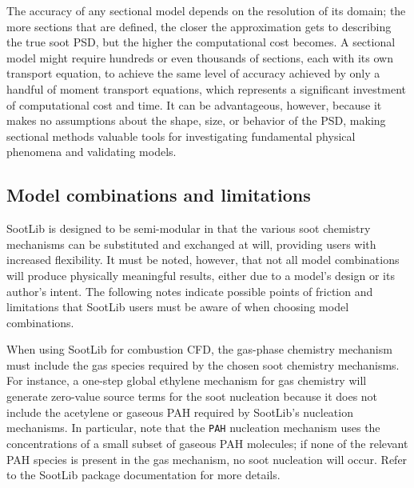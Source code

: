 \documentclass[preprint,letterpaper]{elsarticle}
\begin{document}
The accuracy of any sectional model depends on the resolution of its domain; the more sections that are defined, the closer the approximation gets to describing the true soot PSD, but the higher the computational cost becomes. A sectional model might require hundreds or even thousands of sections, each with its own transport equation, to achieve the same level of accuracy achieved by only a handful of moment transport equations, which represents a significant investment of computational cost and time. It can be advantageous, however, because it makes no assumptions about the shape, size, or behavior of the PSD, making sectional methods valuable tools for investigating fundamental physical phenomena and validating models.

\subsection{Model combinations and limitations}
\label{s:limitations}

SootLib is designed to be semi-modular in that the various soot chemistry mechanisms can be substituted and exchanged at will, providing users with increased flexibility. It must be noted, however, that not all model combinations will produce physically meaningful results, either due to a model's design or its author's intent. The following notes indicate possible points of friction and limitations that SootLib users must be aware of when choosing model combinations.

When using SootLib for combustion CFD, the gas-phase chemistry mechanism must include the gas species required by the chosen soot chemistry mechanisms. For instance, a one-step global ethylene mechanism for gas chemistry will generate zero-value source terms for the soot nucleation because it does not include the acetylene or gaseous PAH required by SootLib's nucleation mechanisms.
In particular, note that the \texttt{PAH} nucleation mechanism uses the concentrations of a small subset of gaseous PAH molecules; if none of the relevant PAH species is present in the gas mechanism, no soot nucleation will occur. Refer to the SootLib package documentation for more details.
\end{document}
